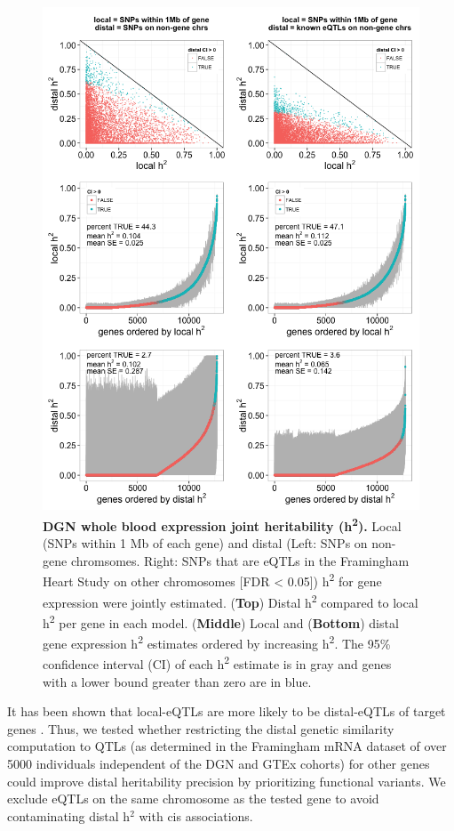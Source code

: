 \documentclass[10pt,letterpaper]{article}
\begin{document}
\begin{figure}[h]
\includegraphics[width=12cm]{Figures/Fig-DGN-jt-h2.png}
\caption{{\bf DGN whole blood expression joint heritability
(h\textsuperscript{2}).} Local (SNPs within 1 Mb of each gene) and distal
(Left: SNPs on non-gene chromsomes. Right: SNPs that are eQTLs in the
Framingham Heart Study on other chromosomes {[}FDR \textless{} 0.05{]})
h\textsuperscript{2} for gene expression were jointly estimated.
(\textbf{Top}) Distal h\textsuperscript{2} compared to local
h\textsuperscript{2} per gene in each model. (\textbf{Middle}) Local and
(\textbf{Bottom}) distal gene expression h\textsuperscript{2} estimates
ordered by increasing h\textsuperscript{2}. The 95\% confidence interval
(CI) of each h\textsuperscript{2} estimate is in gray and genes with a
lower bound greater than zero are in blue.}
\label{fig-dgn-jt-h2}
\end{figure}

It has been shown that local-eQTLs are more likely to be distal-eQTLs of target genes \cite{Pierce_2014}. Thus, we tested whether restricting the distal genetic similarity computation to QTLs (as determined in the Framingham mRNA dataset of over 5000 individuals \cite{Zhang_2015}  independent of the DGN and GTEx cohorts) for other genes could improve distal heritability precision by prioritizing functional variants. We exclude eQTLs on the same chromosome as the tested gene to avoid contaminating distal h$^2$ with cis associations. 
\end{document}
